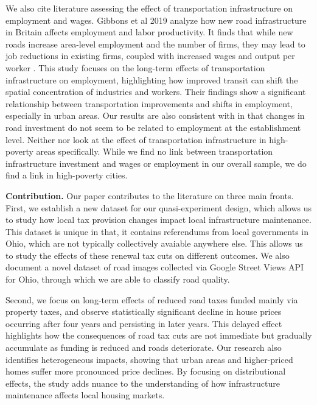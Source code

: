 We also cite literature assessing the effect of transportation infrastructure on employment and wages. Gibbons et al 2019 analyze how new road infrastructure in Britain affects employment and labor productivity. It finds that while new roads increase area-level employment and the number of firms, they may lead to job reductions in existing firms, coupled with increased wages and output per worker \citep{duranton2012}. This study focuses on the long-term effects of transportation infrastructure on employment, highlighting how improved transit can shift the spatial concentration of industries and workers. Their findings show a significant relationship between transportation improvements and shifts in employment, especially in urban areas. Our results are also consistent with \cite{gibbons2019new} in that changes in road investment do not seem to be related to employment at the establishment level.  Neither \cite{dalenberg1995effects} nor \cite{gibbons2019new} look at the effect of transportation infrastructure in high-poverty areas specifically.  While we find no link between transportation infrastructure investment and wages or employment in our overall sample, we do find a link in high-poverty cities.

{\bf Contribution.} Our paper contributes to the literature on three main fronts. First, we establish a new dataset for our quasi-experiment design, which allows us to study how local tax provision changes impact local infrastructure maintenance. This dataset is unique in that, it contains referendums from local governments in Ohio, which are not typically collectively avaiable anywhere else. This allows us to study the effects of these renewal tax cuts on different outcomes. We also document a novel dataset of road images collected via Google Street Views API for Ohio, through which we are able to classify road quality.

Second, we focus on long-term effects of reduced road taxes funded mainly via property taxes, and observe statistically significant decline in house prices occurring after four years and persisting in later years. This delayed effect highlights how the consequences of road tax cuts are not immediate but gradually accumulate as funding is reduced and roads deteriorate. Our research also identifies heterogeneous impacts, showing that urban areas and higher-priced homes suffer more pronounced price declines. By focusing on distributional effects, the study adds nuance to the understanding of how infrastructure maintenance affects local housing markets.

